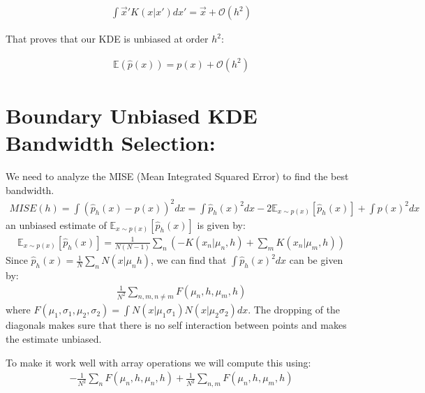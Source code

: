 \documentclass[twocolumn,usenames,dvipsnames,linenumbers]{aastex631}
\begin{document}
\begin{equation}
	\begin{aligned}
	\int \vec{x}'K(x | x')dx' = \vec{x} + \mathcal{O}(h^2)
\end{aligned}
\end{equation}


That proves that our KDE is unbiased at order $h^2$: 

\begin{equation}
\begin{aligned}
	\mathbb{E}(\hat{p}(x)) = p(x) + \mathcal{O}(h^2)
\end{aligned}
\end{equation}


\section{Boundary Unbiased KDE Bandwidth Selection:}

We need to analyze the MISE (Mean Integrated Squared Error) to find the best bandwidth.
\begin{equation}
\begin{aligned}
	MISE(h) = \int (\hat{p}_h(x) - p(x))^2dx = \int \hat{p}_h(x)^2 dx - 2\mathbb{E}_{x\sim p(x)}[\hat{p}_h(x)] + \int p(x)^2 dx
\end{aligned}
\end{equation}
an unbiased estimate of $\mathbb{E}_{x\sim p(x)}[\hat{p}_h(x)]$ is given by:
\begin{equation}
\begin{aligned}
	\mathbb{E}_{x\sim p(x)}[\hat{p}_h(x)] = \frac{1}{N(N-1)}\sum_n \left( - K(x_n | \mu_n, h) + \sum_m K(x_n | \mu_m, h)\right)
\end{aligned}
\end{equation}
Since $\hat{p}_h(x) = \frac{1}{N}\sum_n N(x | \mu_n h)$,
we can find that $\int \hat{p}_h(x)^2 dx $ can be given by:
\begin{equation}
\begin{aligned}
	\frac{1}{N^2} \sum_{n,m, n\neq m} F(\mu_n, h, \mu_m, h)
\end{aligned}
\end{equation}
where $F(\mu_1, \sigma_1, \mu_2, \sigma_2) = \int N(x | \mu_1 \sigma_1)N(x | \mu_2 \sigma_2)dx$. The dropping of the diagonals makes sure that there is no self interaction between points and makes the estimate unbiased.

To make it work well with array operations we will compute this using:
\begin{equation}
\begin{aligned}
	-\frac{1}{N^2}\sum_{n} F(\mu_n, h, \mu_n, h) + \frac{1}{N^2} \sum_{n,m} F(\mu_n, h, \mu_m, h)
\end{aligned}
\end{equation}
\end{document}
